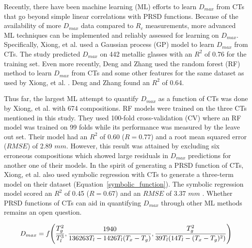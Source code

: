 \documentclass[11pt,a4paper]{article}
\begin{document}
\par
Recently, there have been machine learning (ML) efforts to learn $D_{max}$ from CTs that go beyond simple linear correlations with PRSD functions. Because of the availability of more $D_{max}$ data compared to $R_{c}$ measurements, more advanced ML techniques can be implemented and reliably assessed for learning on $D_{max}$. Specifically, Xiong, et al. \cite{Xiong2019} used a Gaussian process (GP) model to learn $D_{max}$ from CTs. The study predicted $D_{max}$ on 442 metallic glasses with an $R^{2}$ of 0.76 for the training set. Even more recently, Deng and Zhang \cite{Deng2020_2} used the random forest (RF) method to learn $D_{max}$ from CTs and some other features for the same dataset as used by Xiong, et al. \cite{Xiong2019}. Deng and Zhang found an $R^{2}$ of 0.64.

\par
Thus far, the largest ML attempt to quantify $D_{max}$ as a function of CTs was done by Xiong, et al. \cite{Xiong2020} with 674 compositions. RF models were trained on the three CTs mentioned in this study. They used 100-fold cross-validation (CV) where an RF model was trained on 99 folds while its performance was measured by the leave out set.  Their model had an $R^{2}$ of 0.60 ($R=0.77$) and a root mean squared error ($RMSE$) of 2.89 $mm$. However, this result was attained by excluding six erroneous compositions which showed large residuals in $D_{max}$ predictions for another one of their models. In the spirit of generating a PRSD function of CTs, Xiong, et al. also used symbolic regression with CTs to generate a three-term model on their dataset (Equation~\ref{symbolic_function}). The symbolic regression model scored an $R^{2}$ of 0.45 ($R=0.67$) and an $RMSE$ of 3.37 $mm$ \cite{Xiong2020}. Whether PRSD functions of CTs can aid in quantifying $D_{max}$ through other ML methods remains an open question.

\begin{equation}\label{symbolic_function}
    D_{max} = f \Biggl( \frac{T_{g}^{2}}{T_{l}^{3}}, \\
              \frac{1940}{136263T_{l}-1426T_{l}(T_{x}-T_{g})}, \\
              \frac{T_{g}^{2}}{39T_{l}(14T_{l}-(T_{x}-T_{g})^{2})} \Biggl)
\end{equation}
\end{document}
